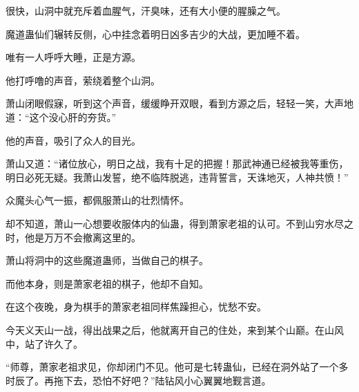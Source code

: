 \begin{this_body}
很快，山洞中就充斥着血腥气，汗臭味，还有大小便的腥臊之气。

魔道蛊仙们辗转反侧，心中挂念着明日凶多吉少的大战，更加睡不着。

唯有一人呼呼大睡，正是方源。

他打呼噜的声音，萦绕着整个山洞。

萧山闭眼假寐，听到这个声音，缓缓睁开双眼，看到方源之后，轻轻一笑，大声地道：“这个没心肝的夯货。”

他的声音，吸引了众人的目光。

萧山又道：“诸位放心，明日之战，我有十足的把握！那武神通已经被我等重伤，明日必死无疑。我萧山发誓，绝不临阵脱逃，违背誓言，天诛地灭，人神共愤！”

众魔头心气一振，都佩服萧山的壮烈情怀。

却不知道，萧山一心想要收服体内的仙蛊，得到萧家老祖的认可。不到山穷水尽之时，他是万万不会撤离这里的。

萧山将洞中的这些魔道蛊师，当做自己的棋子。

而他本身，则是萧家老祖的棋子，他却不自知。

在这个夜晚，身为棋手的萧家老祖同样焦躁担心，忧愁不安。

今天义天山一战，得出战果之后，他就离开自己的住处，来到某个山巅。在山风中，站了许久了。

“师尊，萧家老祖求见，你却闭门不见。他可是七转蛊仙，已经在洞外站了一个多时辰了。再拖下去，恐怕不好吧？”陆钻风小心翼翼地觐言道。

\end{this_body}

